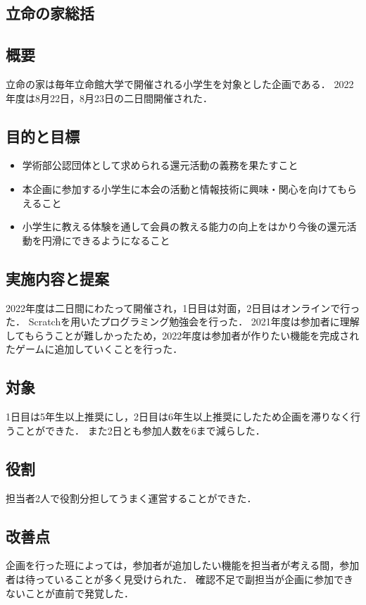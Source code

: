 \subsection*{立命の家総括}


\subsection*{概要}
立命の家は毎年立命館大学で開催される小学生を対象とした企画である．
2022年度は8月22日，8月23日の二日間開催された．

\subsection*{目的と目標}
\begin{itemize}
    \item 学術部公認団体として求められる還元活動の義務を果たすこと
    \item 本企画に参加する小学生に本会の活動と情報技術に興味・関心を向けてもらえること
    \item 小学生に教える体験を通して会員の教える能力の向上をはかり今後の還元活動を円滑にできるようになること
\end{itemize}
\subsection*{実施内容と提案}
2022年度は二日間にわたって開催され，1日目は対面，2日目はオンラインで行った．
Scratchを用いたプログラミング勉強会を行った．
2021年度は参加者に理解してもらうことが難しかったため，2022年度は参加者が作りたい機能を完成されたゲームに追加していくことを行った．

\subsection*{対象}
1日目は5年生以上推奨にし，2日目は6年生以上推奨にしたため企画を滞りなく行うことができた．
また2日とも参加人数を6まで減らした．

\subsection*{役割}
担当者2人で役割分担してうまく運営することができた．

\subsection*{改善点}
企画を行った班によっては，参加者が追加したい機能を担当者が考える間，参加者は待っていることが多く見受けられた．
確認不足で副担当が企画に参加できないことが直前で発覚した．
